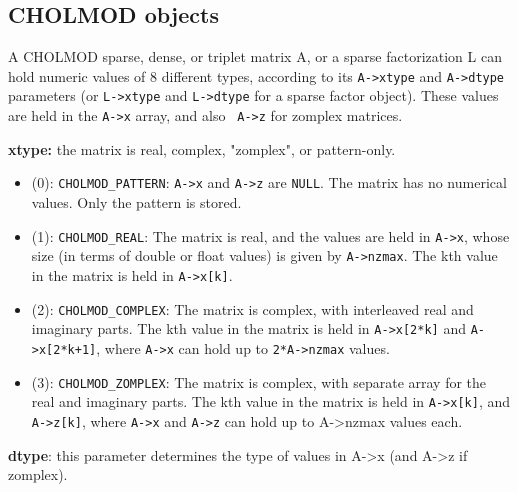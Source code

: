 \documentclass[11pt]{article}
\begin{document}
\subsection{CHOLMOD objects}

A CHOLMOD sparse, dense, or triplet matrix A, or a sparse factorization L can
hold numeric values of 8 different types, according to its {\tt A->xtype} and
{\tt A->dtype} parameters (or {\tt L->xtype} and {\tt L->dtype} for a sparse
factor object).  These values are held in the {\tt A->x} array, and also {\tt
A->z} for zomplex matrices.

{\bf xtype:}   the matrix is real, complex, "zomplex", or pattern-only.

    \begin{itemize}
        \item
        (0): \verb'CHOLMOD_PATTERN':   \verb'A->x' and \verb'A->z' are
        \verb'NULL'.  The matrix has no numerical values.  Only the pattern is
        stored.

        \item
        (1): \verb'CHOLMOD_REAL':      The matrix is real, and the values are
        held in \verb'A->x', whose size (in terms of double or float values) is
        given by \verb'A->nzmax'.  The kth value in the matrix is held in
        \verb'A->x[k]'.

        \item
        (2): \verb'CHOLMOD_COMPLEX':   The matrix is complex, with interleaved
        real and imaginary parts.  The kth value in the matrix is held in
        \verb'A->x[2*k]' and \verb'A->x[2*k+1]', where \verb'A->x' can hold up
        to \verb'2*A->nzmax' values.

        \item
        (3): \verb'CHOLMOD_ZOMPLEX':   The matrix is complex, with separate
        array for the real and imaginary parts.  The kth value in the matrix is
        held in \verb'A->x[k]', and \verb'A->z[k]', where \verb'A->x' and
        \verb'A->z' can hold up to A->nzmax values each.
    \end{itemize}


{\bf dtype}:   this parameter determines the type of values in A->x (and A->z
                if zomplex).
\end{document}
